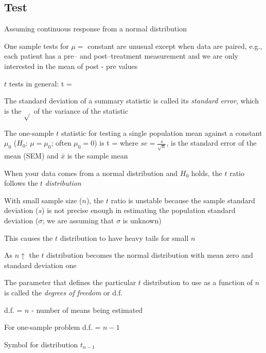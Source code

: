 \subsection{Test}
\bi
\item Assuming continuous response from a normal distribution
\item One sample tests for $\mu =$ constant are unusual except when
  data are paired, e.g., each patient has a pre-- and post--treatment
  measurement and we are only interested in the mean of post - pre
  values
\item $t$ tests in general:
\beq
t = 
\eeq
\item The standard deviation of a summary statistic is called its
  \emph{standard error}, which is the $\sqrt{}$ of the variance of the
  statistic 
\item The one-sample $t$ statistic for testing a single population
  mean against a constant $\mu_0$ ($H_{0}$: $\mu = \mu_{0}$; often
  $\mu_{0} = 0$) is 
\beq
t = 
\eeq
where $se = \frac{s}{\sqrt{n}}$, is the standard error of the mean (SEM) and $\bar{x}$ is the sample mean

\item When your data comes from a normal distribution and $H_{0}$ holds, the
  $t$ ratio follows the $t$ \emph{distribution}
\item With small sample size ($n$), the $t$ ratio is unstable because the sample standard deviation ($s$) is not
  precise enough in estimating the population standard deviation ($\sigma$; we are assuming that $\sigma$
  is unknown)
\item This causes the $t$ distribution to have heavy tails for small
  $n$
\item As $n\uparrow$ the $t$ distribution becomes the normal
  distribution with mean zero and standard deviation one
\item The parameter that defines the particular $t$ distribution to
  use as a function of $n$ is called the \emph{degrees of freedom} or
  d.f.
\item d.f. = $n$ - number of means being estimated
\item For one-sample problem d.f. = $n-1$
\item Symbol for distribution $t_{n-1}$

